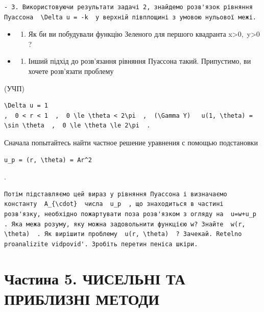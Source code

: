 \documentclass[
  ukrainian,
]{article}
\providecommand{\tightlist}{%
  \setlength{\itemsep}{0pt}\setlength{\parskip}{0pt}}
\begin{document}
\begin{verbatim}
- 3. Використовуючи результати задачі 2, знайдемо розв'язок рівняння Пуассона  \Delta u = -k  у верхній півплощині з умовою нульової межі.
\end{verbatim}

\begin{itemize}
\tightlist
\item
  \begin{enumerate}
  \def\labelenumi{\arabic{enumi}.}
  \setcounter{enumi}{3}
  \tightlist
  \item
    Як би ви побудували функцію Зеленого для першого квадранта
    x\textgreater0,~y\textgreater0 ?
  \end{enumerate}
\item
  \begin{enumerate}
  \def\labelenumi{\arabic{enumi}.}
  \setcounter{enumi}{4}
  \tightlist
  \item
    Інший підхід до розв'язання рівняння Пуассона такий. Припустимо, ви
    хочете розв'язати проблему
  \end{enumerate}
\end{itemize}

(УЧП)

\begin{verbatim}
\Delta u = 1
,  0 < r < 1  ,  0 \le \theta < 2\pi  ,  (\Gamma Y)   u(1, \theta) = \sin \theta  ,  0 \le \theta \le 2\pi  .
\end{verbatim}

Сначала попытайтесь найти частное решение уравнения с помощью
подстановки

\begin{verbatim}
u_p = (r, \theta) = Ar^2
\end{verbatim}

.

\begin{verbatim}
Потім підставляємо цей вираз у рівняння Пуассона і визначаємо константу  A_{\cdot}  числа  u_p  , що знаходиться в частині розв'язку, необхідно пожартувати поза розв'язком з огляду на  u=w+u_p  . Яка межа розуму, яку можна задовольнити функцією w? Знайте  w(r, \theta)  . Як вирішити проблему  u(r, \theta)  ? Зачекай. Retelno proanalizite vidpovid'. Зробіть перетин пеніса шкіри.
\end{verbatim}

\section{Частина 5. ЧИСЕЛЬНІ ТА ПРИБЛИЗНІ
МЕТОДИ}\label{ux447ux430ux441ux442ux438ux43dux430-5.-ux447ux438ux441ux435ux43bux44cux43dux456-ux442ux430-ux43fux440ux438ux431ux43bux438ux437ux43dux456-ux43cux435ux442ux43eux434ux438}
\end{document}
